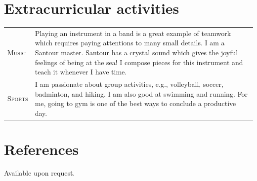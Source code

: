 \documentclass[10PT,letter]{article}
\newcommand{\numbox}[1]{} %
\begin{document}
\section*{\numbox{9}\bfseries\textcolor{titlecol}{\sffamily Extracurricular activities}}

	\begin{tabular}{p{1.2in}p{5.55in}}
		\textsc{Music} & Playing an instrument in a band is a great example of teamwork which requires paying attentions to many small details.   I am a Santour master. Santour has a crystal sound which gives the joyful feelings of being at the sea!  I compose pieces for this instrument and teach it whenever I have time. \\[.5mm]
		\textsc{Sports} & I am passionate about group activities, e.g., volleyball, soccer, badminton, and hiking. I am also good at swimming and running. For me, going to gym is one of the best ways to conclude a productive day. \\[.5mm]
	\end{tabular}
\section*{\numbox{9}\bfseries\textcolor{titlecol}{\sffamily References}}
Available upon request. 
\end{document}
